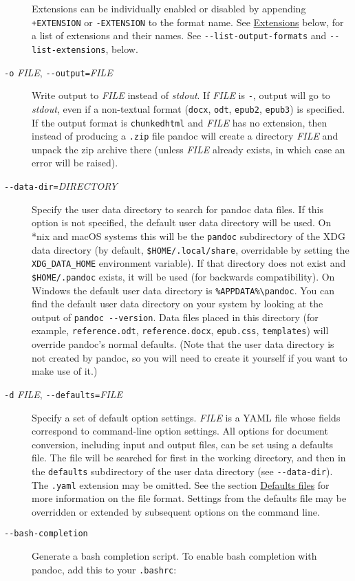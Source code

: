 \documentclass[
  a4paper,
]{article}
\begin{document}
\begin{description}
Extensions can be individually enabled or disabled by appending
\texttt{+EXTENSION} or \texttt{-EXTENSION} to the format name. See
\protect\hyperlink{extensions}{Extensions} below, for a list of
extensions and their names. See \texttt{-\/-list-output-formats} and
\texttt{-\/-list-extensions}, below.
\item[\texttt{-o} \emph{FILE}, \texttt{-\/-output=}\emph{FILE}]
Write output to \emph{FILE} instead of \emph{stdout}. If \emph{FILE} is
\texttt{-}, output will go to \emph{stdout}, even if a non-textual
format (\texttt{docx}, \texttt{odt}, \texttt{epub2}, \texttt{epub3}) is
specified. If the output format is \texttt{chunkedhtml} and \emph{FILE}
has no extension, then instead of producing a \texttt{.zip} file pandoc
will create a directory \emph{FILE} and unpack the zip archive there
(unless \emph{FILE} already exists, in which case an error will be
raised).
\item[\texttt{-\/-data-dir=}\emph{DIRECTORY}]
Specify the user data directory to search for pandoc data files. If this
option is not specified, the default user data directory will be used.
On *nix and macOS systems this will be the \texttt{pandoc} subdirectory
of the XDG data directory (by default, \texttt{\$HOME/.local/share},
overridable by setting the \texttt{XDG\_DATA\_HOME} environment
variable). If that directory does not exist and \texttt{\$HOME/.pandoc}
exists, it will be used (for backwards compatibility). On Windows the
default user data directory is
\texttt{\%APPDATA\%\textbackslash{}pandoc}. You can find the default
user data directory on your system by looking at the output of
\texttt{pandoc\ -\/-version}. Data files placed in this directory (for
example, \texttt{reference.odt}, \texttt{reference.docx},
\texttt{epub.css}, \texttt{templates}) will override pandoc's normal
defaults. (Note that the user data directory is not created by pandoc,
so you will need to create it yourself if you want to make use of it.)
\item[\texttt{-d} \emph{FILE}, \texttt{-\/-defaults=}\emph{FILE}]
Specify a set of default option settings. \emph{FILE} is a YAML file
whose fields correspond to command-line option settings. All options for
document conversion, including input and output files, can be set using
a defaults file. The file will be searched for first in the working
directory, and then in the \texttt{defaults} subdirectory of the user
data directory (see \texttt{-\/-data-dir}). The \texttt{.yaml} extension
may be omitted. See the section
\protect\hyperlink{defaults-files}{Defaults files} for more information
on the file format. Settings from the defaults file may be overridden or
extended by subsequent options on the command line.
\item[\texttt{-\/-bash-completion}]
Generate a bash completion script. To enable bash completion with
pandoc, add this to your \texttt{.bashrc}:


\end{description}
\end{document}
